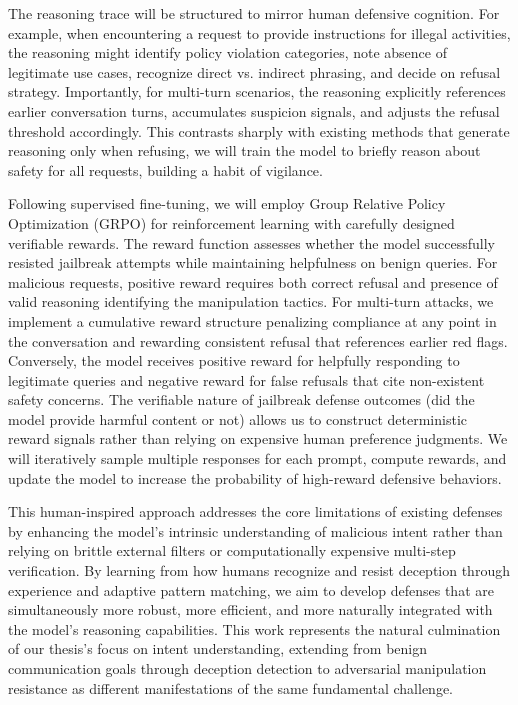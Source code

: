 The reasoning trace will be structured to mirror human defensive cognition. For example, when encountering a request to provide instructions for illegal activities, the reasoning might identify policy violation categories, note absence of legitimate use cases, recognize direct vs. indirect phrasing, and decide on refusal strategy. Importantly, for multi-turn scenarios, the reasoning explicitly references earlier conversation turns, accumulates suspicion signals, and adjusts the refusal threshold accordingly. This contrasts sharply with existing methods that generate reasoning only when refusing, we will train the model to briefly reason about safety for all requests, building a habit of vigilance.

Following supervised fine-tuning, we will employ Group Relative Policy Optimization (GRPO) \cite{shao2024deepseekmath} for reinforcement learning with carefully designed verifiable rewards. The reward function assesses whether the model successfully resisted jailbreak attempts while maintaining helpfulness on benign queries. For malicious requests, positive reward requires both correct refusal and presence of valid reasoning identifying the manipulation tactics. For multi-turn attacks, we implement a cumulative reward structure penalizing compliance at any point in the conversation and rewarding consistent refusal that references earlier red flags. Conversely, the model receives positive reward for helpfully responding to legitimate queries and negative reward for false refusals that cite non-existent safety concerns. The verifiable nature of jailbreak defense outcomes (did the model provide harmful content or not) allows us to construct deterministic reward signals rather than relying on expensive human preference judgments. We will iteratively sample multiple responses for each prompt, compute rewards, and update the model to increase the probability of high-reward defensive behaviors.

This human-inspired approach addresses the core limitations of existing defenses by enhancing the model's intrinsic understanding of malicious intent rather than relying on brittle external filters or computationally expensive multi-step verification. By learning from how humans recognize and resist deception through experience and adaptive pattern matching, we aim to develop defenses that are simultaneously more robust, more efficient, and more naturally integrated with the model's reasoning capabilities. This work represents the natural culmination of our thesis's focus on intent understanding, extending from benign communication goals through deception detection to adversarial manipulation resistance as different manifestations of the same fundamental challenge.